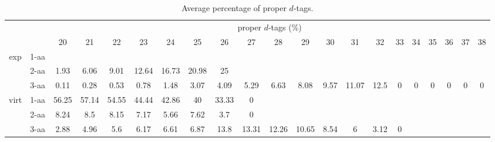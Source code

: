 \begin{table}[h]\tiny
\vspace{3mm}
{\centering
\begin{center}
\begin{tabular}{|c|l|c|c|c|c|c|c|c|c|c|c|c|c|c|c|c|c|c|c|c|}
  \hline
  \multicolumn{2}{|c|}{ } & \multicolumn{ 19 }{|c|}{ proper $d$-tags (\%)} \\
  \cline{3- 21}
  \multicolumn{2}{|c|}{ }  & 20 & 21 & 22 & 23 & 24 & 25 & 26 & 27 & 28 & 29 & 30 & 31 & 32 & 33 & 34 & 35 & 36 & 37 & 38\\
  \hline
  \multirow{3}{*}{exp}
&  1-aa  &  &  &  &  &  &  &  &  &  &  &  &  &  &  &  &  &  &  & \\
&  2-aa  & 1.93 & 6.06 & 9.01 & 12.64 & 16.73 & 20.98 & 25 &  &  &  &  &  &  &  &  &  &  &  & \\
&  3-aa  & 0.11 & 0.28 & 0.53 & 0.78 & 1.48 & 3.07 & 4.09 & 5.29 & 6.63 & 8.08 & 9.57 & 11.07 & 12.5 & 0 & 0 & 0 & 0 & 0 & 0\\
 \hline
  \multirow{3}{*}{virt} 
&  1-aa  & 56.25 & 57.14 & 54.55 & 44.44 & 42.86 & 40 & 33.33 & 0 &  &  &  &  &  &  &  &  &  &  & \\
&  2-aa  & 8.24 & 8.5 & 8.15 & 7.17 & 5.66 & 7.62 & 3.7 & 0 &  &  &  &  &  &  &  &  &  &  & \\
&  3-aa  & 2.88 & 4.96 & 5.6 & 6.17 & 6.61 & 6.87 & 13.8 & 13.31 & 12.26 & 10.65 & 8.54 & 6 & 3.12 & 0 &  &  &  &  & \\
 \hline
\end{tabular}
\end{center}
\par}
\centering

\caption{ Average percentage of proper $d$-tags.}

\vspace{3mm}
\label{table:proper-d-tags}
\end{table}

